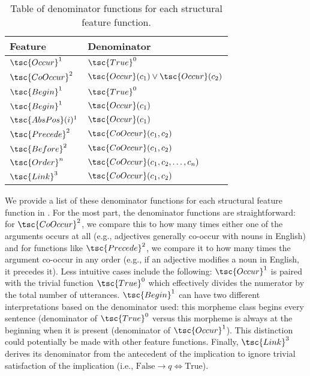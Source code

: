 \begin{table}
  \centering
  \begin{tabular}{ll}
  \toprule
  Feature & Denominator \\
  \midrule
  $\tsc{Occur}^1$ & $\tsc{True}^0$ \\
  $\tsc{CoOccur}^2$ & $\tsc{Occur}(c_1) \vee \tsc{Occur}(c_2)$ \\
  $\tsc{Begin}^1$ & $\tsc{True}^0$ \\
  $\tsc{Begin}^1$ & $\tsc{Occur}(c_1)$ \\
  $\tsc{AbsPos}(i)^1$ & $\tsc{Occur}(c_1)$ \\
  $\tsc{Precede}^2$ & $\tsc{CoOccur}(c_1, c_2)$ \\
  $\tsc{Before}^2$ & $\tsc{CoOccur}(c_1, c_2)$ \\
  $\tsc{Order}^n$ & $\tsc{CoOccur}(c_1, c_2, \dots, c_n)$ \\
  $\tsc{Link}^3$ & $\tsc{CoOccur}(c_1, c_2)$ \\
  \bottomrule
  \end{tabular}
  \caption{Table of denominator functions for each structural feature function.}
  \unskip\label{tab:sff-denominators}
\end{table}

We provide a list of these denominator functions for each structural feature function in .
For the most part, the denominator functions are straightforward:
  for $\tsc{CoOccur}^2$, we compare this to how many times either one of the arguments occurs at all (e.g., adjectives generally co-occur with nouns in English)
  and for functions like $\tsc{Precede}^2$, we compare it to how many times the argument co-occur in any order (e.g., if an adjective modifies a noun in English, it precedes it).
Less intuitive cases include the following:
  $\tsc{Occur}^1$ is paired with the trivial function $\tsc{True}^0$ which effectively divides the numerator by the total number of utterances.
  $\tsc{Begin}^1$ can have two different interpretations based on the denominator used: this morpheme class begins every sentence (denominator of $\tsc{True}^0$ versus this morpheme is always at the beginning when it is present (denominator of $\tsc{Occur}^1$).
    This distinction could potentially be made with other feature functions.
  Finally, $\tsc{Link}^3$ derives its denominator from the antecedent of the implication to ignore trivial satisfaction of the implication (i.e., $\text{False} \rightarrow q \Leftrightarrow \text{True}$).

